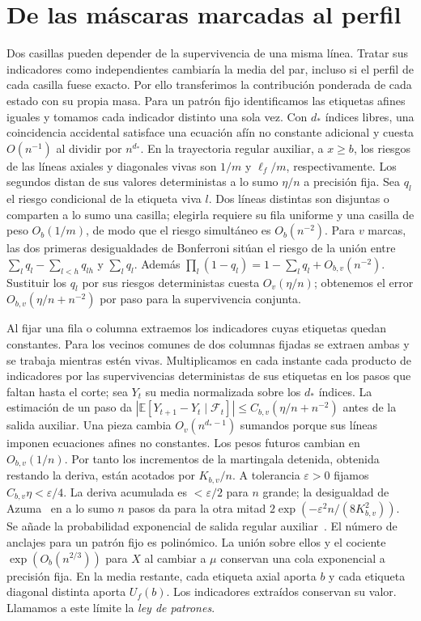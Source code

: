 \section{De las máscaras marcadas al perfil}\label{app:transfer}
Dos casillas pueden depender de la supervivencia de una misma línea. Tratar sus indicadores
como independientes cambiaría la media del par, incluso si el perfil de cada casilla fuese
exacto. Por ello transferimos la contribución ponderada de cada estado con su propia masa.
Para un patrón fijo identificamos las etiquetas afines iguales y tomamos cada indicador
distinto una sola vez. Con \(d_*\) índices libres,
una coincidencia accidental satisface una ecuación afín no constante adicional y cuesta
\(O(n^{-1})\) al dividir por \(n^{d_*}\). En la trayectoria regular auxiliar, a \(x\ge b\), los
riesgos de las líneas axiales y diagonales vivas son \(1/m\) y \(\ell_f/m\), respectivamente.
Los segundos distan de sus valores deterministas a lo sumo \(\eta/n\) a precisión fija.
\label{paso:bonferroni-azuma}
Sea \(q_l\) el riesgo condicional de la etiqueta viva \(l\). Dos líneas distintas
son disjuntas o comparten a lo sumo una casilla; elegirla requiere su fila uniforme y
una casilla de peso \(O_b(1/m)\), de modo que el riesgo simultáneo es \(O_b(n^{-2})\).
Para \(v\) marcas, las dos primeras desigualdades de Bonferroni sitúan el riesgo
de la unión entre \(\sum_l q_l-\sum_{l<h}q_{lh}\) y \(\sum_l q_l\).
Además \(\prod_l(1-q_l)=1-\sum_l q_l+O_{b,v}(n^{-2})\).
Sustituir los \(q_l\) por sus riesgos deterministas cuesta \(O_v(\eta/n)\);
obtenemos el error \(O_{b,v}(\eta/n+n^{-2})\) por paso para la supervivencia conjunta.

Al fijar una fila o columna extraemos los indicadores cuyas etiquetas quedan constantes.
Para los vecinos comunes de dos columnas fijadas se extraen ambas y se trabaja mientras
estén vivas. Multiplicamos en cada instante cada producto de indicadores por las
supervivencias deterministas de sus etiquetas en los pasos que faltan hasta el corte;
sea \(Y_t\) su media normalizada sobre los \(d_*\) índices. La estimación de un paso
da \(|\mathbb E[Y_{t+1}-Y_t\mid\mathcal F_t]|\le C_{b,v}(\eta/n+n^{-2})\) antes de
la salida auxiliar. Una pieza cambia \(O_v(n^{d_*-1})\) sumandos porque sus líneas
imponen ecuaciones afines no constantes. Los pesos futuros cambian en \(O_{b,v}(1/n)\).
Por tanto los incrementos de la martingala detenida, obtenida restando la deriva,
están acotados por \(K_{b,v}/n\). A tolerancia \(\varepsilon>0\) fijamos
\(C_{b,v}\eta<\varepsilon/4\). La deriva acumulada es \(<\varepsilon/2\) para \(n\)
grande; la desigualdad de Azuma~\cite{azuma} en a lo sumo \(n\) pasos da para la otra mitad
\(2\exp(-\varepsilon^2 n/(8K_{b,v}^2))\). Se añade la probabilidad exponencial de
salida regular auxiliar~\cite[§4]{tc}. El número de anclajes para un patrón fijo
es polinómico. La unión sobre ellos y el cociente \(\exp(O_b(n^{2/3}))\) para \(X\)
al cambiar a \(\mu\) conservan una cola exponencial a precisión fija.
En la media restante, cada etiqueta axial aporta \(b\) y cada etiqueta diagonal distinta aporta
\(U_f(b)\). Los indicadores extraídos conservan su valor. Llamamos a este límite la \emph{ley de patrones}.

